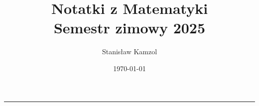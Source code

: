 

\title{\Huge\bfseries Notatki z Matematyki\\[1ex]\large\color{ctpSubtext} Semestr zimowy 2025}
\author{\large Stanisław Kamzol}
\date{\today}


\color{ctpText}

\maketitle
\hrule height 1.2pt
\vspace{1.5em}
\tableofcontents
\newpage




